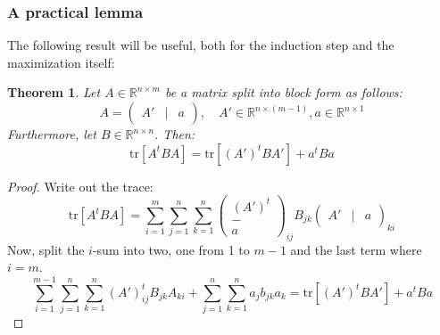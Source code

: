 \documentclass[12pt, a4paper]{article}
\newtheorem{theorem}{Theorem}[section]
\numberwithin{equation}{section}
\begin{document}
\subsubsection{A practical lemma}
The following result will be useful, both for the induction step and the maximization itself:
\begin{theorem}
\label{split_trace}
Let $A\in\mathbb{R}^{n\times m}$ be a matrix split into block form as follows:
\begin{equation}
A=\begin{pmatrix}
A' & | & a
\end{pmatrix},\quad
A'\in\mathbb{R}^{n\times(m-1)}, a\in\mathbb{R}^{n\times 1}
\end{equation}
Furthermore, let $B\in\mathbb{R}^{n\times n}$. Then:
\begin{equation}
\textrm{tr}[A^t BA]=\textrm{tr}[(A')^t BA']+a^t Ba
\end{equation}
\end{theorem}
\begin{proof}
Write out the trace:
\begin{equation}
\textrm{tr}[A^t BA]=\sum_{i=1}^m\sum_{j=1}^n\sum_{k=1}^n
\begin{pmatrix}
(A')^t \\ - \\ a
\end{pmatrix}_{ij}
B_{jk}
\begin{pmatrix}
A' & | & a
\end{pmatrix}_{ki}
\end{equation}
Now, split the $i$-sum into two, one from 1 to $m-1$ and the last term where $i=m$.
\begin{equation}
\sum_{i=1}^{m-1}\sum_{j=1}^n\sum_{k=1}^n(A')^t_{ij}B_{jk}A_{ki}+\sum_{j=1}^n\sum_{k=1}^n a_j b_{jk}a_k=\textrm{tr}[(A')^t BA']+a^t Ba
\end{equation}
\end{proof}
\end{document}
